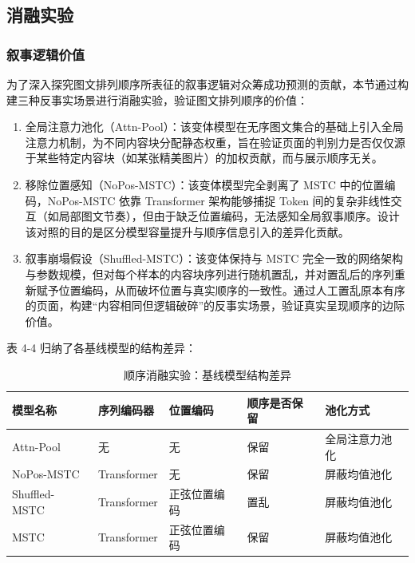 \subsection{消融实验}

\subsubsection{叙事逻辑价值}

为了深入探究图文排列顺序所表征的叙事逻辑对众筹成功预测的贡献，本节通过构建三种反事实场景进行消融实验，验证图文排列顺序的价值：

\begin{enumerate}
\def\labelenumi{(\arabic{enumi})}
\item
  全局注意力池化（Attn-Pool）：该变体模型在无序图文集合的基础上引入全局注意力机制，为不同内容块分配静态权重，旨在验证页面的判别力是否仅仅源于某些特定内容块（如某张精美图片）的加权贡献，而与展示顺序无关。
\item
  移除位置感知（NoPos-MSTC）：该变体模型完全剥离了 MSTC 中的位置编码，NoPos-MSTC 依靠 Transformer 架构能够捕捉 Token 间的复杂非线性交互（如局部图文节奏），但由于缺乏位置编码，无法感知全局叙事顺序。设计该对照的目的是区分模型容量提升与顺序信息引入的差异化贡献。
\item
  叙事崩塌假设（Shuffled-MSTC）：该变体保持与 MSTC 完全一致的网络架构与参数规模，但对每个样本的内容块序列进行随机置乱，并对置乱后的序列重新赋予位置编码，从而破坏位置与真实顺序的一致性。通过人工置乱原本有序的页面，构建``内容相同但逻辑破碎''的反事实场景，验证真实呈现顺序的边际价值。
\end{enumerate}

表 4-4 归纳了各基线模型的结构差异：

\begin{table}[H]
\centering
\caption{顺序消融实验：基线模型结构差异}
\label{tab:exp4_4}
\renewcommand{\tabularxcolumn}[1]{p{#1}}
\begin{tabularx}{\textwidth}{@{}>{\raggedright\arraybackslash}p{2.9cm}>{\raggedright\arraybackslash}p{2.3cm}>{\raggedright\arraybackslash}p{2.8cm}>{\raggedright\arraybackslash}p{1.5cm}>{\raggedright\arraybackslash}X@{}}
\toprule
\textbf{模型名称} & \textbf{序列编码器} & \textbf{位置编码} & \textbf{顺序是否保留} & \textbf{池化方式} \\ \midrule
Attn-Pool & 无 & 无 & 保留 & \parbox[t]{\linewidth}{全局注意力池化} \\
NoPos-MSTC & Transformer & 无 & 保留 & 屏蔽均值池化 \\
Shuffled-MSTC & Transformer & 正弦位置编码 & 置乱 & 屏蔽均值池化 \\
MSTC & Transformer & 正弦位置编码 & 保留 & 屏蔽均值池化 \\ \bottomrule
\end{tabularx}
\end{table}

